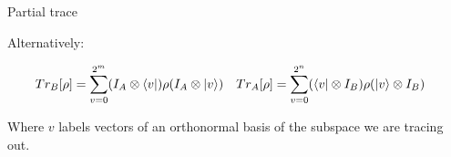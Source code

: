 \documentclass[11pt,svgnames,smaller,aspectratio=43,english]{beamer}
\newcommand{\tensor}{\otimes}
\begin{document}
\begin{frame}{Partial trace}
	\begin{center}
		Alternatively:
	\end{center}
	\vspace*{-2em}
	\begin{align*}
		Tr_B[\rho] &= \sum_{v=0}^{2^m} (I_A \tensor \bra{v})\rho(I_A \tensor \ket{v}) && Tr_A[\rho] = \sum_{v=0}^{2^n} (\bra{v} \tensor I_B)\rho(\ket{v} \tensor I_B)
	\end{align*}
	\begin{center}
		Where $v$ labels vectors of an orthonormal basis of the subspace we are tracing out.		
	\end{center}
\end{frame}


\end{document}
